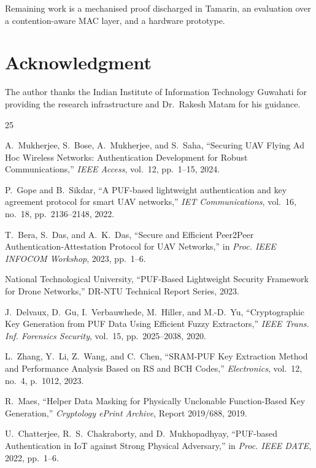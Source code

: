 \documentclass[11pt,a4paper]{article}
\begin{document}
Remaining work is a mechanised proof discharged in Tamarin, an evaluation over a
contention-aware MAC layer, and a hardware prototype.

\section*{Acknowledgment}
The author thanks the Indian Institute of Information Technology Guwahati for
providing the research infrastructure and Dr.\ Rakesh Matam for his guidance.

\begin{thebibliography}{25}

A.~Mukherjee, S.~Bose, A.~Mukherjee, and S.~Saha, ``Securing UAV Flying Ad Hoc Wireless Networks: Authentication Development for Robust Communications,'' \textit{IEEE Access}, vol.~12, pp.~1--15, 2024.

P.~Gope and B.~Sikdar, ``A PUF-based lightweight authentication and key agreement protocol for smart UAV networks,'' \textit{IET Communications}, vol.~16, no.~18, pp.~2136--2148, 2022.

T.~Bera, S.~Das, and A.~K.~Das, ``Secure and Efficient Peer2Peer Authentication-Attestation Protocol for UAV Networks,'' in \textit{Proc. IEEE INFOCOM Workshop}, 2023, pp.~1--6.

National Technological University, ``PUF-Based Lightweight Security Framework for Drone Networks,'' DR-NTU Technical Report Series, 2023.

J.~Delvaux, D.~Gu, I.~Verbauwhede, M.~Hiller, and M.-D.~Yu, ``Cryptographic Key Generation from PUF Data Using Efficient Fuzzy Extractors,'' \textit{IEEE Trans. Inf. Forensics Security}, vol.~15, pp.~2025--2038, 2020.

L.~Zhang, Y.~Li, Z.~Wang, and C.~Chen, ``SRAM-PUF Key Extraction Method and Performance Analysis Based on RS and BCH Codes,'' \textit{Electronics}, vol.~12, no.~4, p.~1012, 2023.

R.~Maes, ``Helper Data Masking for Physically Unclonable Function-Based Key Generation,'' \textit{Cryptology ePrint Archive}, Report 2019/688, 2019.

U.~Chatterjee, R.~S.~Chakraborty, and D.~Mukhopadhyay, ``PUF-based Authentication in IoT against Strong Physical Adversary,'' in \textit{Proc. IEEE DATE}, 2022, pp.~1--6.


\end{thebibliography}
\end{document}
